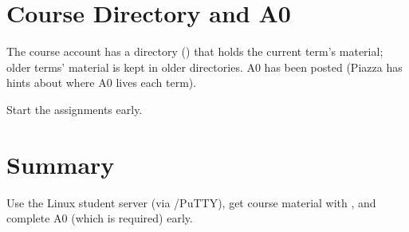 \section{Course Directory and A0}
The course account has a directory () that holds the current
term's material; older terms' material is kept in older directories. A0 has been
posted (Piazza has hints about where A0 lives each term).

\begin{important}[Advice]
Start the assignments early.
\end{important}

\section*{Summary}
Use the Linux student server (via /PuTTY), get course material with
, and complete A0 (which is required) early.
